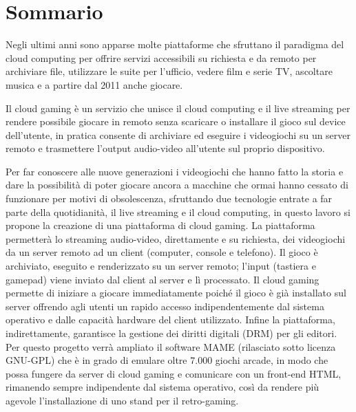 %
%

\chapter*{Sommario}

Negli ultimi anni sono apparse molte piattaforme che sfruttano il paradigma del cloud computing per offrire servizi accessibili su richiesta e da remoto per archiviare file, utilizzare le suite per l'ufficio, vedere film e serie TV, ascoltare musica e a partire dal 2011 anche giocare.

Il cloud gaming è un servizio che unisce il cloud computing e il live streaming per rendere possibile giocare in remoto senza scaricare o installare il gioco sul device dell'utente, in pratica consente di archiviare ed eseguire i videogiochi su un server remoto e trasmettere l'output audio-video all'utente sul proprio dispositivo.

Per far conoscere alle nuove generazioni i videogiochi che hanno fatto la storia e dare la possibilità di poter giocare ancora a macchine che ormai hanno cessato di funzionare per motivi di obsolescenza, sfruttando due tecnologie entrate a far parte della quotidianità, il live streaming e il cloud computing, in questo lavoro si propone la creazione di una piattaforma di cloud gaming. La piattaforma permetterà lo streaming audio-video, direttamente e su richiesta, dei videogiochi da un server remoto ad un client (computer, console e telefono). Il gioco è archiviato, eseguito e renderizzato su un server remoto; l'input (tastiera e gamepad) viene inviato dal client al server e lì processato. Il cloud gaming permette di iniziare a giocare immediatamente poiché il gioco è già installato sul server offrendo agli utenti un rapido accesso indipendentemente dal sistema operativo e dalle capacità hardware del client utilizzato. Infine la piattaforma, indirettamente, garantisce la gestione dei diritti digitali (DRM) per gli editori. Per questo progetto verrà ampliato il software MAME (rilasciato sotto licenza GNU-GPL) che è in grado di emulare oltre 7.000 giochi arcade, in modo che possa fungere da server di cloud gaming e comunicare con un front-end HTML, rimanendo sempre indipendente dal sistema operativo, così da rendere più agevole l’installazione di uno stand per il retro-gaming.